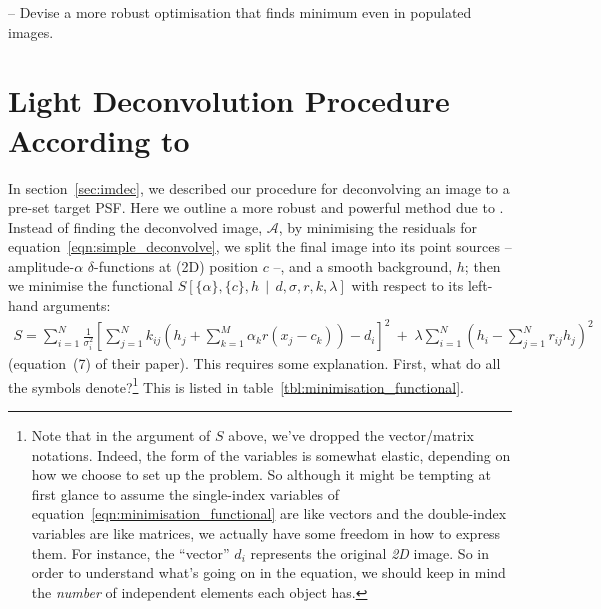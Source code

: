 \documentclass[letterpaper, 11pt]{article}
\begin{document}
-- Devise a more robust optimisation that finds minimum even in populated images.



\section{Light Deconvolution Procedure According to \citet{MCS98}}
\label{sec:MCS98procedure}

In section~\ref{sec:imdec}, we described our procedure for deconvolving an image to a pre-set target PSF. Here we outline a more robust and powerful method due to \citet{MCS98}. Instead of finding the deconvolved image, $\mathcal A$, by minimising the residuals for equation~\ref{eqn:simple_deconvolve}, we split the final image into its point sources -- amplitude-$\alpha$ $\delta$-functions at (2D) position $c$ --, and a smooth background, $h$; then we minimise the functional $S\left[\{\alpha\},\{c\}, h \,\middle|\, {d}, {\sigma}, {r}, {k}, \lambda \right]$ with respect to its left-hand arguments:
\begin{align}
	S = \sum_{i=1}^N \frac{1}{\sigma_i^2} \left[ \sum_{j=1}^N k_{ij} \left(h_j +\sum_{k=1}^M \alpha_k r(x_j-c_k)\right) - d_i \right]^2\
			+\; \lambda\sum_{i=1}^N \left( h_i - \sum_{j=1}^N r_{ij}h_j \right)^2 \label{eqn:minimisation_functional}
\end{align}
(equation~(7) of their paper). This requires some explanation. First, what do all the symbols denote?\footnote{Note that in the argument of $S$ above, we've dropped the vector/matrix notations. Indeed, the form of the variables is somewhat elastic, depending on how we choose to set up the problem. So although it might be tempting at first glance to assume the single-index variables of equation~\ref{eqn:minimisation_functional} are like vectors and the double-index variables are like matrices, we actually have some freedom in how to express them. For instance, the ``vector'' $d_i$ represents the original \emph{2D} image. So in order to understand what's going on in the equation, we should keep in mind the \emph{number} of independent elements each object has.} This is listed in table~\ref{tbl:minimisation_functional}.
\end{document}
